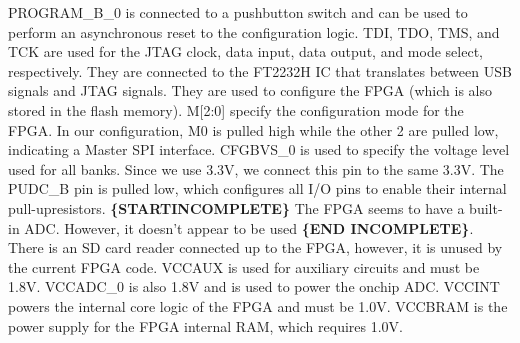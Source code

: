 PROGRAM\_B\_0 is connected to a pushbutton switch and can be used to perform an asynchronous reset
to the configuration logic. TDI, TDO, TMS, and TCK are used for the JTAG clock, data input, data
output, and mode select, respectively. They are connected to the FT2232H IC that translates between
USB signals and JTAG signals. They are used to configure the FPGA (which is also stored in the flash
memory). M[2:0] specify the configuration mode for the FPGA. In our configuration, M0 is pulled high
while the other 2 are pulled low, indicating a Master SPI interface. CFGBVS\_0 is used to specify
the voltage level used for all banks. Since we use 3.3V, we connect this pin to the same 3.3V. The
PUDC\_B pin is pulled low, which configures all I/O pins to enable their internal
pull-upresistors. \textbf{\{STARTINCOMPLETE\}} The FPGA seems to have a built-in ADC. However, it
doesn't appear to be used \textbf{\{END INCOMPLETE\}}. There is an SD card reader connected up to
the FPGA, however, it is unused by the current FPGA code. VCCAUX is used for auxiliary circuits and
must be 1.8V. VCCADC\_0 is also 1.8V and is used to power the onchip ADC. VCCINT powers the internal
core logic of the FPGA and must be 1.0V. VCCBRAM is the power supply for the FPGA internal RAM,
which requires 1.0V.